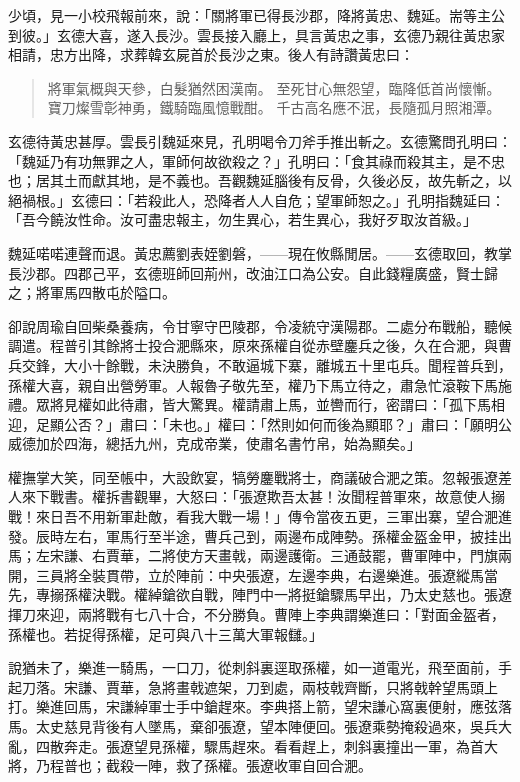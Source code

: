 少頃，見一小校飛報前來，說：「關將軍已得長沙郡，降將黃忠、魏延。耑等主公到彼。」玄德大喜，遂入長沙。雲長接入廳上，具言黃忠之事，玄德乃親往黃忠家相請，忠方出降，求葬韓玄屍首於長沙之東。後人有詩讚黃忠曰：

\begin{quote}
將軍氣概與天參，白髮猶然困漢南。
至死甘心無怨望，臨降低首尚懷慚。
寶刀燦雪彰神勇，鐵騎臨風憶戰酣。
千古高名應不泯，長隨孤月照湘潭。
\end{quote}

玄德待黃忠甚厚。雲長引魏延來見，孔明喝令刀斧手推出斬之。玄德驚問孔明曰：「魏延乃有功無罪之人，軍師何故欲殺之？」孔明曰：「食其祿而殺其主，是不忠也；居其土而獻其地，是不義也。吾觀魏延腦後有反骨，久後必反，故先斬之，以絕禍根。」玄德曰：「若殺此人，恐降者人人自危；望軍師恕之。」孔明指魏延曰：「吾今饒汝性命。汝可盡忠報主，勿生異心，若生異心，我好歹取汝首級。」

魏延喏喏連聲而退。黃忠薦劉表姪劉磐，——現在攸縣閒居。——玄德取回，教掌長沙郡。四郡己平，玄德班師回荊州，改油江口為公安。自此錢糧廣盛，賢士歸之；將軍馬四散屯於隘口。

卻說周瑜自回柴桑養病，令甘寧守巴陵郡，令凌統守漢陽郡。二處分布戰船，聽候調遣。程普引其餘將士投合淝縣來，原來孫權自從赤壁鏖兵之後，久在合淝，與曹兵交鋒，大小十餘戰，未決勝負，不敢逼城下寨，離城五十里屯兵。聞程普兵到，孫權大喜，親自出營勞軍。人報魯子敬先至，權乃下馬立待之，肅急忙滾鞍下馬施禮。眾將見權如此待肅，皆大驚異。權請肅上馬，並轡而行，密謂曰：「孤下馬相迎，足顯公否？」肅曰：「未也。」權曰：「然則如何而後為顯耶？」肅曰：「願明公威德加於四海，總括九州，克成帝業，使肅名書竹帛，始為顯矣。」

權撫掌大笑，同至帳中，大設飲宴，犒勞鏖戰將士，商議破合淝之策。忽報張遼差人來下戰書。權拆書觀畢，大怒曰：「張遼欺吾太甚！汝聞程普軍來，故意使人搦戰！來日吾不用新軍赴敵，看我大戰一場！」傳令當夜五更，三軍出寨，望合淝進發。辰時左右，軍馬行至半途，曹兵己到，兩邊布成陣勢。孫權金盔金甲，披挂出馬；左宋謙、右賈華，二將使方天畫戟，兩邊護衛。三通鼓罷，曹軍陣中，門旗兩開，三員將全裝貫帶，立於陣前：中央張遼，左邊李典，右邊樂進。張遼縱馬當先，專搦孫權決戰。權綽鎗欲自戰，陣門中一將挺鎗驟馬早出，乃太史慈也。張遼揮刀來迎，兩將戰有七八十合，不分勝負。曹陣上李典謂樂進曰：「對面金盔者，孫權也。若捉得孫權，足可與八十三萬大軍報讎。」

說猶未了，樂進一騎馬，一口刀，從刺斜裏逕取孫權，如一道電光，飛至面前，手起刀落。宋謙、賈華，急將畫戟遮架，刀到處，兩枝戟齊斷，只將戟幹望馬頭上打。樂進回馬，宋謙綽軍士手中鎗趕來。李典搭上箭，望宋謙心窩裏便射，應弦落馬。太史慈見背後有人墜馬，棄卻張遼，望本陣便回。張遼乘勢掩殺過來，吳兵大亂，四散奔走。張遼望見孫權，驟馬趕來。看看趕上，刺斜裏撞出一軍，為首大將，乃程普也；截殺一陣，救了孫權。張遼收軍自回合淝。

